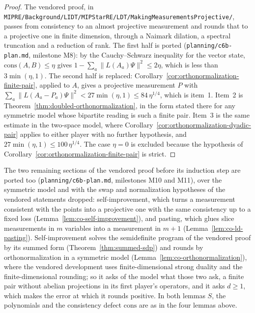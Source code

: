 \begin{proof}
\leanok
The vendored proof, in \texttt{MIPRE/Background/LIDT/MIPStarRE/LDT/MakingMeasurementsProjective/},
passes from consistency to an almost projective measurement and rounds that to a projective one in
finite dimension, through a Naimark dilation, a spectral truncation and a reduction of rank. The
first half is ported (\texttt{planning/c6b-plan.md}, milestone M8): by the Cauchy--Schwarz
inequality for the vector state, $\mathrm{cons}(A, B) \leq \eta$ gives $1 - \sum_a \| L(A_a) \Psi
\|^2 \leq 2 \eta$, which is less than $3 \min(\eta, 1)$. The second half is replaced:
Corollary~\ref{cor:orthonormalization-finite-pair}, applied to $A$, gives a projective measurement
$P$ with $\sum_a \| L(A_a - P_a) \Psi \|^2 < 27 \min(\eta, 1) \leq 84\, \eta^{1/4}$, which is
item~1. Item~2 is Theorem~\ref{thm:doubled-orthonormalization}, in the form stated there for any
symmetric model whose bipartite reading is such a finite pair. Item~3 is the same estimate in the
two-space model, where Corollary~\ref{cor:orthonormalization-dyadic-pair} applies to either player
with no further hypothesis, and $27 \min(\eta, 1) \leq 100\, \eta^{1/4}$. The case $\eta = 0$ is
excluded because the hypothesis of Corollary~\ref{cor:orthonormalization-finite-pair} is strict.
\end{proof}

The two remaining sections of the vendored proof before its induction step are ported too
(\texttt{planning/c6b-plan.md}, milestones M10 and M11), over the symmetric model and with the
swap and normalization hypotheses of the vendored statements dropped: self-improvement, which
turns a measurement consistent with the points into a projective one with the same consistency
up to a fixed loss (Lemma~\ref{lem:co-self-improvement}), and pasting, which glues slice
measurements in $m$ variables into a measurement in $m + 1$ (Lemma~\ref{lem:co-ld-pasting}).
Self-improvement solves the semidefinite program of the vendored proof by its summed form
(Theorem~\ref{thm:summed-sdp}) and rounds by orthonormalization in a symmetric model
(Lemma~\ref{lem:co-orthonormalization}), where the vendored development uses finite-dimensional
strong duality and the finite-dimensional rounding; so it asks of the model what those two ask,
a finite pair without abelian projections in its first player's operators, and it asks $d \geq
1$, which makes the error at which it rounds positive. In both lemmas $S$, the polynomials and
the consistency defect $\mathrm{cons}$ are as in the four lemmas above.

